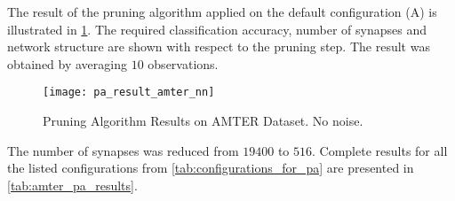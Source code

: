 The result of the pruning algorithm applied on the default configuration (A) is illustrated in \cref{fig:pa_result_amter}. The required classification accuracy, number of synapses and network structure are shown with respect to the pruning step. The result was obtained by averaging $ 10 $ observations.

\begin{figure}[H]
  \centering
  \texttt{[image: pa\_result\_amter\_nn]}
  \caption{Pruning Algorithm Results on AMTER Dataset. No noise.}
  \label{fig:pa_result_amter}
\end{figure}

The number of synapses was reduced from $ 19400 $ to $ 516 $. Complete results for all the listed configurations from \cref{tab:configurations_for_pa} are presented in \cref{tab:amter_pa_results}.

